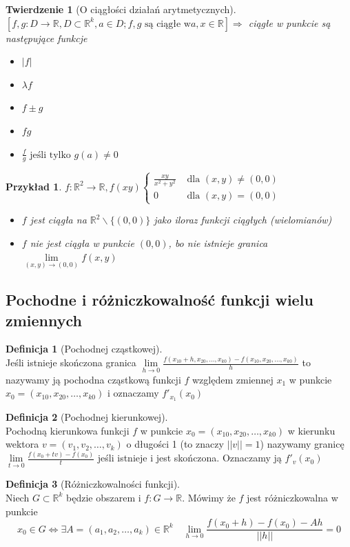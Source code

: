 \documentclass[12pt,a4paper]{article}
\newtheorem{tw}{Twierdzenie}
\newtheorem{przyklad}{Przykład}
\theoremstyle{definition}
\newtheorem{df}{Definicja}
\begin{document}
\begin{tw}[O ciągłości działań arytmetycznych]~\\
$[f,g: D\to \mathbb{R}, D\subset\mathbb{R}^k, a\in D; f,g \text{ są ciągłe w} a, x\in\mathbb{R}] \Rightarrow$ ciągłe w punkcie są następujące funkcje

\begin{itemize}
	\item $|f| $
	\item $\lambda f $
	\item $f \pm g $
	\item $fg$ 
	\item $\frac{f}{g} \text{ jeśli tylko } g(a) \neq 0$
\end{itemize}

\end{tw}
\begin{przyklad}
$ f:\mathbb{R}^2 \to\mathbb{R}, f(xy) \begin{cases} 
	\frac{xy}{x^2+y^2} & \text{ dla } (x,y) \neq (0,0)\\
	0 & \text{ dla } (x,y) = (0,0)
\end{cases}$\\

\begin{itemize}
	\item $f$ jest ciągła na $\mathbb{R}^2 \smallsetminus \{(0,0)\}$ jako iloraz funkcji ciągłych (wielomianów)
	\item $f$ nie jest ciągła w punkcie $(0,0)$, bo nie istnieje granica $\lim\limits_{(x,y)\to(0,0)}f(x,y)$
\end{itemize}
\end{przyklad}

\subsection{Pochodne i różniczkowalność funkcji wielu zmiennych}
\begin{df}[Pochodnej cząstkowej]~\\
Jeśli istnieje skończona granica $\lim\limits_{h\to 0} \frac{f(x_{10}+h, x_{20}, \dots, x_{k0})-f(x_{10}, x_{20}, \dots, x_{k0})}{h}$ to nazywamy ją pochodna cząstkową funkcji $f$ względem zmiennej $x_1$ w punkcie $x_0 = (x_{10}, x_{20}, \dots, x_{k0})$ i oznaczamy $f'_{x_1}(x_0)$		
\end{df}
\begin{df}[Pochodnej kierunkowej]~\\
Pochodną kierunkowa funkcji $f$ w punkcie $x_0 = (x_{10}, x_{20}, \dots, x_{k0})$ w kierunku wektora  $v = (v_{1}, v_{2}, \dots, v_{k})$ o długości 1 (to znaczy $||v|| = 1$) nazywamy granicę $\lim\limits_{t\to  0}\frac{f(x_0+tv) - f(x_0)}{t}$ jeśli istnieje i jest skończona. Oznaczamy ją $f'_v(x_0)$
\end{df}
\begin{df}[Różniczkowalności funkcji]~\\
Niech $G\subset \mathbb{R}^k$ będzie obszarem i $f:G\to \mathbb{R}$. Mówimy że $f$ jest różniczkowalna w punkcie $$x_0\in G \Leftrightarrow \exists A=(a_1, a_2, \dots, a_k) \in \mathbb{R}^k \quad \lim\limits
_{h\to 0}\frac{f(x_0+h)-f(x_0)-Ah}{||h||} = 0$$
\end{df}
\end{document}
